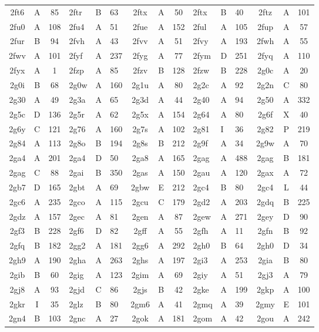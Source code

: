 \begin{longtable}{|c|c|c| a|a|a| c|c|c| a|a|a| c|c|c|}
2ft6 & A & 85 & 2ftr & B & 63 & 2ftx & A & 50 & 2ftx & B & 40 & 2ftz & A & 101\\
2fu0 & A & 108 & 2fu4 & A & 51 & 2fue & A & 152 & 2ful & A & 105 & 2fup & A & 57\\
2fur & B & 94 & 2fvh & A & 43 & 2fvv & A & 51 & 2fvy & A & 193 & 2fwh & A & 55\\
2fwv & A & 101 & 2fyf & A & 237 & 2fyg & A & 77 & 2fym & D & 251 & 2fyq & A & 110\\
2fyx & A & 1 & 2fzp & A & 85 & 2fzv & B & 128 & 2fzw & B & 228 & 2g0c & A & 20\\
2g0i & B & 68 & 2g0w & A & 160 & 2g1u & A & 80 & 2g2c & A & 92 & 2g2n & C & 80\\
2g30 & A & 49 & 2g3a & A & 65 & 2g3d & A & 44 & 2g40 & A & 94 & 2g50 & A & 332\\
2g5c & D & 136 & 2g5r & A & 62 & 2g5x & A & 154 & 2g64 & A & 80 & 2g6f & X & 40\\
2g6y & C & 121 & 2g76 & A & 160 & 2g7s & A & 102 & 2g81 & I & 36 & 2g82 & P & 219\\
2g84 & A & 113 & 2g8o & B & 194 & 2g8s & B & 212 & 2g9f & A & 34 & 2g9w & A & 70\\
2ga4 & A & 201 & 2ga4 & D & 50 & 2ga8 & A & 165 & 2gag & A & 488 & 2gag & B & 181\\
2gag & C & 88 & 2gai & B & 350 & 2gas & A & 150 & 2gau & A & 120 & 2gax & A & 72\\
2gb7 & D & 165 & 2gbt & A & 69 & 2gbw & E & 212 & 2gc4 & B & 80 & 2gc4 & L & 44\\
2gc6 & A & 235 & 2gco & A & 115 & 2gcu & C & 179 & 2gd2 & A & 203 & 2gdq & B & 225\\
2gdz & A & 157 & 2gec & A & 81 & 2gen & A & 87 & 2gew & A & 271 & 2gey & D & 90\\
2gf3 & B & 228 & 2gf6 & D & 82 & 2gff & A & 55 & 2gfh & A & 11 & 2gfn & B & 92\\
2gfq & B & 182 & 2gg2 & A & 181 & 2gg6 & A & 292 & 2gh0 & B & 64 & 2gh0 & D & 34\\
2gh9 & A & 190 & 2gha & A & 263 & 2ghs & A & 197 & 2gi3 & A & 253 & 2gia & B & 80\\
2gib & B & 60 & 2gig & A & 123 & 2gim & A & 69 & 2giy & A & 51 & 2gj3 & A & 79\\
2gj8 & A & 93 & 2gjd & C & 86 & 2gjs & B & 42 & 2gke & A & 199 & 2gkp & A & 100\\
2gkr & I & 35 & 2glz & B & 80 & 2gm6 & A & 41 & 2gmq & A & 39 & 2gmy & E & 101\\
2gn4 & B & 103 & 2gnc & A & 27 & 2gok & A & 181 & 2gom & A & 42 & 2gou & A & 242\\

\end{longtable}

